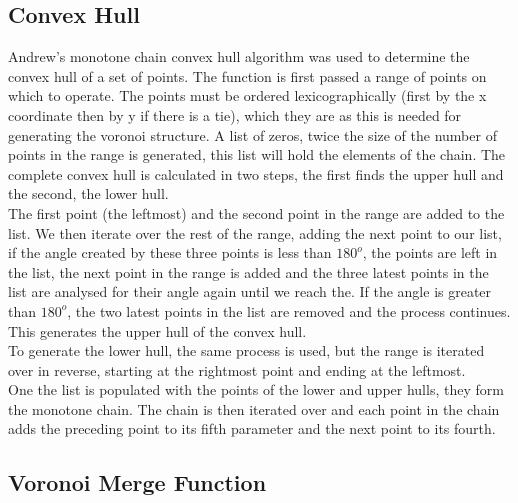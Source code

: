 \subsection{Convex Hull}
Andrew's monotone chain convex hull algorithm was used to determine the convex hull of a set of points. The function is first passed a range of points on which to operate. The points must be ordered lexicographically (first by the x coordinate then by y if there is a tie), which they are as this is needed for generating the voronoi structure. A list of zeros, twice the size of the number of points in the range is generated, this list will hold the elements of the chain. The complete convex hull is calculated in two steps, the first finds the upper hull and the second, the lower hull.
\\
The first point (the leftmost) and the second point in the range are added to the list. We then iterate over the rest of the range, adding the next point to our list, if the angle created by these three points is less than $180^o$, the points are left in the list, the next point in the range is added and the three latest points in the list are analysed for their angle again until we reach the. If the angle is greater than $180^o$, the two latest points in the list are removed and the process continues. This generates the upper hull of the convex hull.
\\
To generate the lower hull, the same process is used, but the range is iterated over in reverse, starting at the rightmost point and ending at the leftmost.
\\
One the list is populated with the points of the lower and upper hulls, they form the monotone chain. The chain is then iterated over and each point in the chain adds the preceding point to its fifth parameter and the next point to its fourth.

\subsection{Voronoi Merge Function}